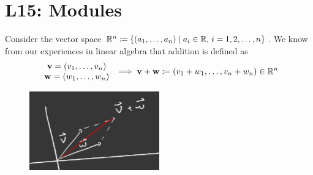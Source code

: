 \documentclass[../Main.tex]{subfiles}
\begin{document}
\chapter{L15: Modules}
Consider the vector space $\mathbb{R}^n \coloneqq \{(a_1,\dots,a_n)\mid a_i \in \mathbb{R}, \, i=1,2,\dots,n\}$. We know from our experiences in linear algebra that addition is defined as
\[\begin{array}{c}
	\mathbf{v} = (v_1,\dots,v_n)\\
	\mathbf{w} = (w_1,\dots,w_n)
\end{array}\implies \mathbf{v}+\mathbf{w} \coloneqq (v_1+w_1,\dots,v_n+w_n)\in \mathbb{R}^n\] 
\begin{figure}[!h]
	\centering
	\includegraphics[width=0.5\textwidth]{VecAdd2}
\end{figure}
\end{document}

